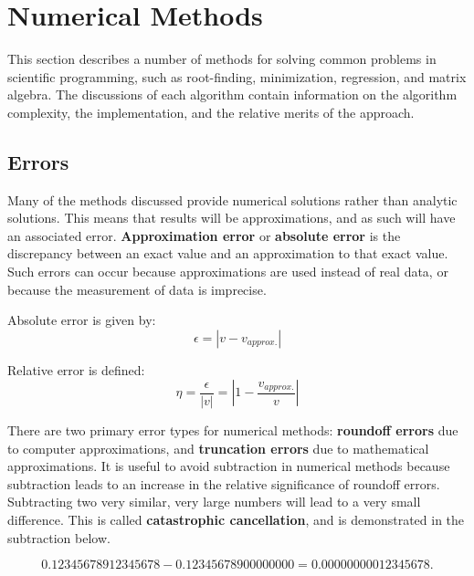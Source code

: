 \section{Numerical Methods}

This section describes a number of methods for solving common problems in scientific programming, such as root-finding, minimization, regression, and matrix algebra. The discussions of each algorithm contain information on the algorithm complexity, the implementation, and the relative merits of the approach. 

\subsection{Errors}

Many of the methods discussed provide numerical solutions rather than analytic solutions. This means that results will be approximations, and as such will have an associated error. \textbf{Approximation error} or \textbf{absolute error} is the discrepancy between an exact value and an approximation to that exact value. Such errors can occur because approximations are used instead of real data, or because the measurement of data is imprecise. 

Absolute error is given by:
\begin{equation}
\epsilon = |v-v_{approx.}|
\end{equation}

Relative error is defined:
\begin{equation}
\eta = \frac{\epsilon}{|v|} = |1 - \frac{v_{approx.}}{v}|
\end{equation}

There are two primary error types for numerical methods: \textbf{roundoff errors} due to computer approximations, and \textbf{truncation errors} due to mathematical approximations. It is useful to avoid subtraction in numerical methods because subtraction leads to an increase in the relative significance of roundoff errors. Subtracting two very similar, very large numbers will lead to a very small difference. This is called \textbf{catastrophic cancellation}, and is demonstrated in the subtraction below.

\begin{equation}
0.12345678912345678 - 0.12345678900000000 = 0.00000000012345678.
\end{equation}

